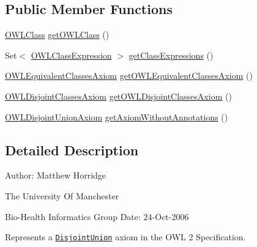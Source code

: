 \subsection*{Public Member Functions}
\begin{DoxyCompactItemize}
\item 
\hyperlink{interfaceorg_1_1semanticweb_1_1owlapi_1_1model_1_1_o_w_l_class}{O\-W\-L\-Class} \hyperlink{interfaceorg_1_1semanticweb_1_1owlapi_1_1model_1_1_o_w_l_disjoint_union_axiom_abb7c1a3aabcf136aba84685885b8a79b}{get\-O\-W\-L\-Class} ()
\item 
Set$<$ \hyperlink{interfaceorg_1_1semanticweb_1_1owlapi_1_1model_1_1_o_w_l_class_expression}{O\-W\-L\-Class\-Expression} $>$ \hyperlink{interfaceorg_1_1semanticweb_1_1owlapi_1_1model_1_1_o_w_l_disjoint_union_axiom_ac7cdffc4d6eb32781553952471489ec1}{get\-Class\-Expressions} ()
\item 
\hyperlink{interfaceorg_1_1semanticweb_1_1owlapi_1_1model_1_1_o_w_l_equivalent_classes_axiom}{O\-W\-L\-Equivalent\-Classes\-Axiom} \hyperlink{interfaceorg_1_1semanticweb_1_1owlapi_1_1model_1_1_o_w_l_disjoint_union_axiom_ae3eb52b6191ca5c88458839d850e285a}{get\-O\-W\-L\-Equivalent\-Classes\-Axiom} ()
\item 
\hyperlink{interfaceorg_1_1semanticweb_1_1owlapi_1_1model_1_1_o_w_l_disjoint_classes_axiom}{O\-W\-L\-Disjoint\-Classes\-Axiom} \hyperlink{interfaceorg_1_1semanticweb_1_1owlapi_1_1model_1_1_o_w_l_disjoint_union_axiom_a8eef9eb61ddc4862eacfeae4bf9f5753}{get\-O\-W\-L\-Disjoint\-Classes\-Axiom} ()
\item 
\hyperlink{interfaceorg_1_1semanticweb_1_1owlapi_1_1model_1_1_o_w_l_disjoint_union_axiom}{O\-W\-L\-Disjoint\-Union\-Axiom} \hyperlink{interfaceorg_1_1semanticweb_1_1owlapi_1_1model_1_1_o_w_l_disjoint_union_axiom_afc63ea1028e8ddb638ee5b5f1473309d}{get\-Axiom\-Without\-Annotations} ()
\end{DoxyCompactItemize}


\subsection{Detailed Description}
Author\-: Matthew Horridge\par
 The University Of Manchester\par
 Bio-\/\-Health Informatics Group Date\-: 24-\/\-Oct-\/2006 

Represents a \href{http://www.w3.org/TR/2009/REC-owl2-syntax-20091027/#Disjoint_Union_of_Class_Expressions}{\tt Disjoint\-Union} axiom in the O\-W\-L 2 Specification. 

